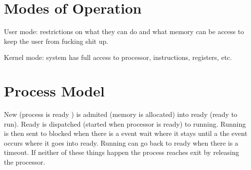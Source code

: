 \documentclass[12pt]{article}
\begin{document}
\section{Modes of Operation}
User mode: restrictions on what they can do and what memory can be access to keep the user from fucking shit up.

Kernel mode: system has full access to processor, instructions, registers, etc.

\section{Process Model}
New (process is ready ) is admited (memory is allocated) into ready (ready to run). Ready is dispatched (started when processor is ready) to running. Running is then sent to blocked when there is a event wait where it stays until a the event occurs where it goes into ready. Running can go back to ready when there is a timeout. If neither of these things happen the process reaches exit by releasing the processor.
\end{document}
